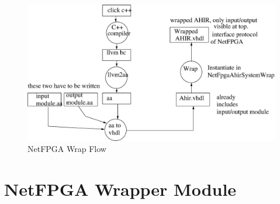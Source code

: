 \documentclass{article}
\begin{document}
\begin{figure}
  \centering
  \includegraphics[scale=0.7]{NetFPGAWrap.eps}
  \caption{NetFPGA Wrap Flow}
  \label{fig:Wrap}
\end{figure}

\section{NetFPGA Wrapper Module}
\end{document}
